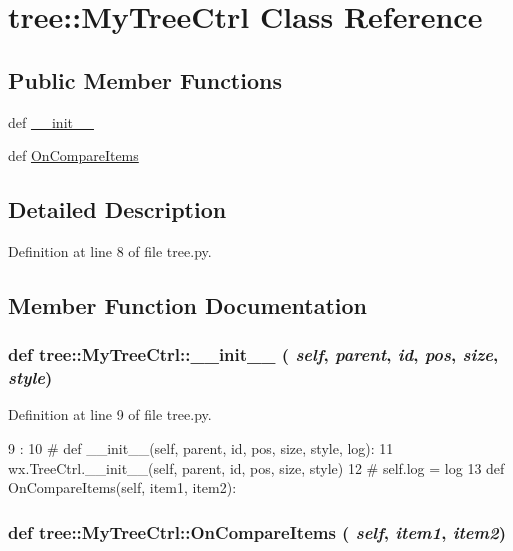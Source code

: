 \hypertarget{classtree_1_1MyTreeCtrl}{
\section{tree::MyTreeCtrl Class Reference}
\label{classtree_1_1MyTreeCtrl}
}
\subsection*{Public Member Functions}
\begin{DoxyCompactItemize}
\item 
def \hyperlink{classtree_1_1MyTreeCtrl_a8eae483e5dc8a1c82b0b3c6687b9d44f}{\_\-\_\-init\_\-\_\-}
\item 
def \hyperlink{classtree_1_1MyTreeCtrl_a645b08b71723f5c7b7f10f4cbebfbd5e}{OnCompareItems}
\end{DoxyCompactItemize}


\subsection{Detailed Description}


Definition at line 8 of file tree.py.

\subsection{Member Function Documentation}
\hypertarget{classtree_1_1MyTreeCtrl_a8eae483e5dc8a1c82b0b3c6687b9d44f}{
\subsubsection[{\_\-\_\-init\_\-\_\-}]{\setlength{\rightskip}{0pt plus 5cm}def tree::MyTreeCtrl::\_\-\_\-init\_\-\_\- ( {\em self}, \/   {\em parent}, \/   {\em id}, \/   {\em pos}, \/   {\em size}, \/   {\em style})}}
\label{classtree_1_1MyTreeCtrl_a8eae483e5dc8a1c82b0b3c6687b9d44f}


Definition at line 9 of file tree.py.


\begin{DoxyCode}
9                                                     :
10     #    def __init__(self, parent, id, pos, size, style, log):
11         wx.TreeCtrl.__init__(self, parent, id, pos, size, style)
12 #        self.log = log
13 
    def OnCompareItems(self, item1, item2):
\end{DoxyCode}
\hypertarget{classtree_1_1MyTreeCtrl_a645b08b71723f5c7b7f10f4cbebfbd5e}{
\subsubsection[{OnCompareItems}]{\setlength{\rightskip}{0pt plus 5cm}def tree::MyTreeCtrl::OnCompareItems ( {\em self}, \/   {\em item1}, \/   {\em item2})}}
\label{classtree_1_1MyTreeCtrl_a645b08b71723f5c7b7f10f4cbebfbd5e}


